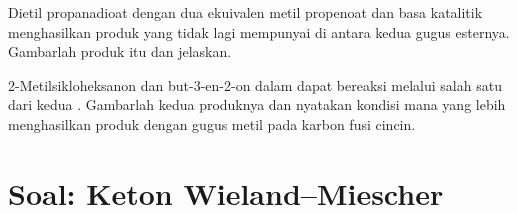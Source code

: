 \begin{exercise}[$\star\star\star$]\label{exo:b2:conjugate-additions:11}
Dietil propanadioat dengan dua ekuivalen metil propenoat dan basa katalitik
menghasilkan produk yang tidak lagi mempunyai  di antara kedua gugus
esternya. Gambarlah produk itu dan jelaskan.
\end{exercise}

\begin{exercise}[$\star\star\star$]\label{exo:b2:conjugate-additions:12}
2-Metilsikloheksanon dan but-3-en-2-on dalam  dapat bereaksi
melalui salah satu dari kedua . Gambarlah kedua produknya dan
nyatakan kondisi mana yang lebih menghasilkan produk dengan gugus metil
pada karbon fusi cincin.
\end{exercise}

\clearpage
\enlargethispage{3\baselineskip}
\section{Soal: Keton Wieland--Miescher}

